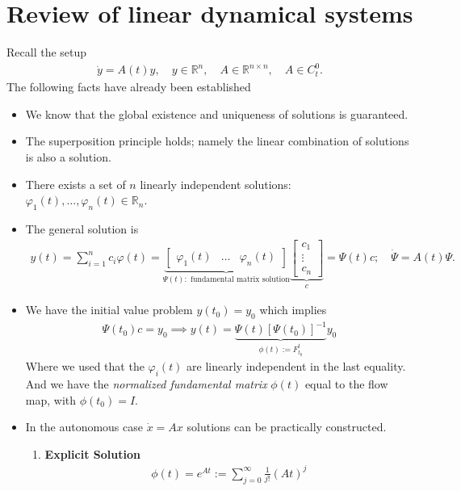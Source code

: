 \section{Review of linear dynamical systems}
Recall the setup
\begin{align}
	\dot{{y} } = {A} (t){y}, \quad {y} \in \mathbb{R}^{n}, \quad {A} \in \mathbb{R}^{n \times n}, \quad {A} \in C^{0}_{t}.
\end{align}
The following facts have already been established
\begin{itemize}
	\item We know that the global existence and uniqueness of solutions is guaranteed. 
	\item The superposition principle holds; namely the linear combination of solutions is also a solution.
	\item There exists a set of $n$ linearly independent solutions: $\varphi_1(t), \ldots, \varphi_n(t) \in \mathbb{R}_{n}$.
	\item The general solution is
		\begin{align}
			y(t) = \sum_{i=1}^{n} c_i \varphi(t) =
			\underbrace{\begin{bmatrix}
				\varphi_1(t) & \ldots & \varphi_n(t)
		\end{bmatrix}}_{\Psi(t):  \textrm{ fundamental matrix solution} }
		\underbrace{\begin{bmatrix}
			c_1 \\ \vdots \\ c_n
	\end{bmatrix}}_{c}
	= \Psi(t) {c}; \quad \dot{\Psi} = A(t) \Psi.			
		\end{align}
	\item We have the initial value problem ${y} (t_0) = {y} _0$ which implies
		\begin{align}
			\Psi(t_0) {c} = {y} _0 \implies {y} (t) = \underbrace{\Psi(t) \left[\Psi(t_0)\right]^{-1}}_{\phi(t):= F_{t_0}^{t}}{y} _0 
		\end{align}
		Where we used that the $\varphi_i(t)$ are linearly independent in the last equality. And we have the \emph{normalized fundamental matrix} $\phi(t)$ equal to the flow map, with $\phi(t_0)={I} $.
	\item In the autonomous case $\dot{{x} }= {A} {x} $ solutions can be practically constructed.
	\begin{enumerate} 
		\item \textbf{Explicit Solution} 
		\begin{align}
			\phi(t) = e^{{A} t} := \sum_{j=0}^{\infty } \frac{1}{j!} ({A} t)^{j}

\end{align}
\end{enumerate}
\end{itemize}
